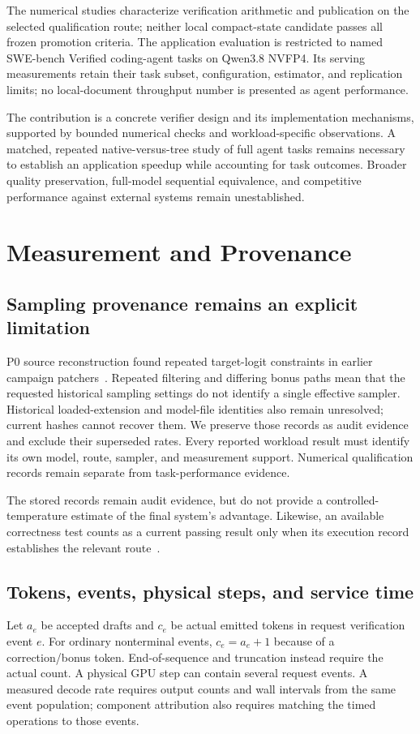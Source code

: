 \documentclass[conference]{IEEEtran}
\begin{document}
The numerical studies characterize verification arithmetic and publication on the selected qualification route; neither local compact-state candidate passes all frozen promotion criteria. The application evaluation is restricted to named SWE-bench Verified coding-agent tasks on Qwen3.8 NVFP4. Its serving measurements retain their task subset, configuration, estimator, and replication limits; no local-document throughput number is presented as agent performance.

The contribution is a concrete verifier design and its implementation mechanisms, supported by bounded numerical checks and workload-specific observations. A matched, repeated native-versus-tree study of full agent tasks remains necessary to establish an application speedup while accounting for task outcomes. Broader quality preservation, full-model sequential equivalence, and competitive performance against external systems remain unestablished.

\appendices
\section{Measurement and Provenance}
\label{app:audit}
\subsection{Sampling provenance remains an explicit limitation}
P0 source reconstruction found repeated target-logit constraints in earlier campaign patchers~\cite{lumo2026levers}. Repeated filtering and differing bonus paths mean that the requested historical sampling settings do not identify a single effective sampler. Historical loaded-extension and model-file identities also remain unresolved; current hashes cannot recover them. We preserve those records as audit evidence and exclude their superseded rates. Every reported workload result must identify its own model, route, sampler, and measurement support. Numerical qualification records remain separate from task-performance evidence.

The stored records remain audit evidence, but do not provide a controlled-temperature estimate of the final system's advantage. Likewise, an available correctness test counts as a current passing result only when its execution record establishes the relevant route~\cite{lumo2026archive}.

\subsection{Tokens, events, physical steps, and service time}
Let $a_e$ be accepted drafts and $c_e$ be actual emitted tokens in request verification event $e$. For ordinary nonterminal events, $c_e=a_e+1$ because of a correction/bonus token. End-of-sequence and truncation instead require the actual count. A physical GPU step can contain several request events. A measured decode rate requires output counts and wall intervals from the same event population; component attribution also requires matching the timed operations to those events.
\end{document}
